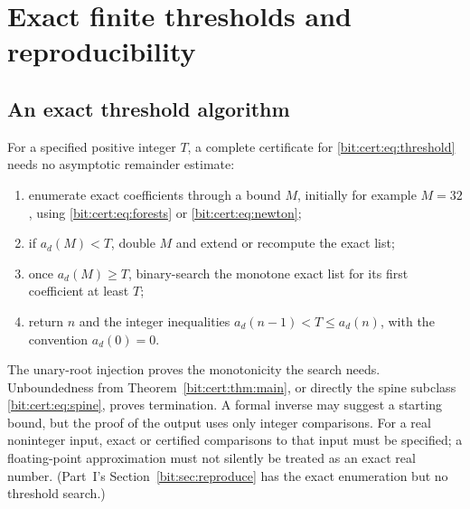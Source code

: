 \documentclass[11pt]{article}
\theoremstyle{definition}\newtheorem{definition}[theorem]{Definition}
\theoremstyle{remark}\newtheorem{remark}[theorem]{Remark}
\begin{document}
\section{Exact finite thresholds and reproducibility}\label{bit:cert:sec:repro}
\subsection{An exact threshold algorithm}
For a specified positive integer $T$, a complete certificate for
\eqref{bit:cert:eq:threshold} needs no asymptotic remainder estimate:
\begin{enumerate}
\item enumerate exact coefficients through a bound $M$, initially for example
 $M=32$, using \eqref{bit:cert:eq:forests} or \eqref{bit:cert:eq:newton};
\item if $a_d(M)<T$, double $M$ and extend or recompute the exact list;
\item once $a_d(M)\ge T$, binary-search the monotone exact list for its first
 coefficient at least $T$;
\item return $n$ and the integer inequalities $a_d(n-1)<T\le a_d(n)$, with the
 convention $a_d(0)=0$.
\end{enumerate}
The unary-root injection proves the monotonicity the search needs.
Unboundedness from Theorem~\ref{bit:cert:thm:main}, or directly the spine
subclass \eqref{bit:cert:eq:spine}, proves termination. A formal inverse may
suggest a starting bound, but the proof of the output uses only integer
comparisons. For a real noninteger input, exact or certified comparisons to
that input must be specified; a floating-point approximation must not silently
be treated as an exact real number. (Part~I's
Section~\ref{bit:sec:reproduce} has the exact enumeration but no threshold
search.)
\end{document}
